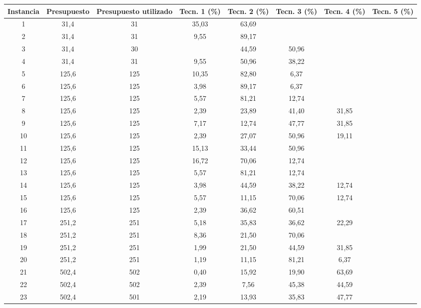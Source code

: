 \documentclass{article}
\begin{document}
  \begin{table}
    \centering
    \begin{tabular}{cccccccc}
        \toprule
        Instancia & Presupuesto & Presupuesto utilizado & Tecn. 1 (\%) & Tecn. 2 (\%) & Tecn. 3 (\%) & Tecn. 4 (\%) & Tecn. 5 (\%) \\
        \midrule
        1 & 31,4 & 31 & 35,03 & 63,69 &  &  &  \\
        2 & 31,4 & 31 & 9,55 & 89,17 &  &  &  \\
        3 & 31,4 & 30 &  & 44,59 & 50,96 &  &  \\
        4 & 31,4 & 31 & 9,55 & 50,96 & 38,22 &  &  \\
        5 & 125,6 & 125 & 10,35 & 82,80 & 6,37 &  &  \\
        6 & 125,6 & 125 & 3,98 & 89,17 & 6,37 &  &  \\
        7 & 125,6 & 125 & 5,57 & 81,21 & 12,74 &  &  \\
        8 & 125,6 & 125 & 2,39 & 23,89 & 41,40 & 31,85 &  \\
        9 & 125,6 & 125 & 7,17 & 12,74 & 47,77 & 31,85 &  \\
        10 & 125,6 & 125 & 2,39 & 27,07 & 50,96 & 19,11 &  \\
        11 & 125,6 & 125 & 15,13 & 33,44 & 50,96 &  &  \\
        12 & 125,6 & 125 & 16,72 & 70,06 & 12,74 &  &  \\
        13 & 125,6 & 125 & 5,57 & 81,21 & 12,74 &  &  \\
        14 & 125,6 & 125 & 3,98 & 44,59 & 38,22 & 12,74 &  \\
        15 & 125,6 & 125 & 5,57 & 11,15 & 70,06 & 12,74 &  \\
        16 & 125,6 & 125 & 2,39 & 36,62 & 60,51 &  &  \\
        17 & 251,2 & 251 & 5,18 & 35,83 & 36,62 & 22,29 &  \\
        18 & 251,2 & 251 & 8,36 & 21,50 & 70,06 &  &  \\
        19 & 251,2 & 251 & 1,99 & 21,50 & 44,59 & 31,85 &  \\
        20 & 251,2 & 251 & 1,19 & 11,15 & 81,21 & 6,37 &  \\
        21 & 502,4 & 502 & 0,40 & 15,92 & 19,90 & 63,69 &  \\
        22 & 502,4 & 502 & 2,39 & 7,56 & 45,38 & 44,59 &  \\
        23 & 502,4 & 501 & 2,19 & 13,93 & 35,83 & 47,77 &  \\

\end{tabular}
\end{table}
\end{document}
